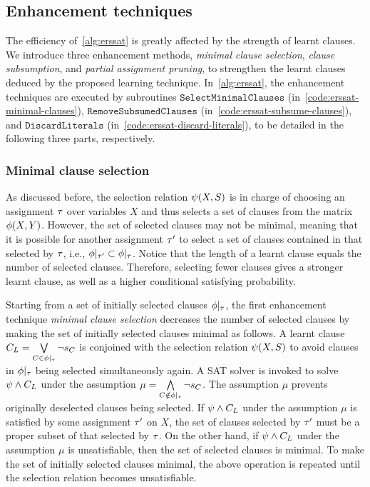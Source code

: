 \subsection{Enhancement techniques}
The efficiency of~\cref{alg:erssat} is greatly affected by the strength of learnt clauses.
We introduce three enhancement methods,
\textit{minimal clause selection},
\textit{clause subsumption}, and
\textit{partial assignment pruning},
to strengthen the learnt clauses deduced by the proposed learning technique.
In~\cref{alg:erssat},
the enhancement techniques are executed by subroutines
$\texttt{SelectMinimalClauses}$ (in~\cref{code:erssat-minimal-clauses}),
$\texttt{RemoveSubsumedClauses}$ (in~\cref{code:erssat-subsume-clauses}), and
$\texttt{DiscardLiterals}$ (in~\cref{code:erssat-discard-literals}),
to be detailed in the following three parts, respectively.

\subsubsection{Minimal clause selection}
As discussed before,
the selection relation $\psi(X,S)$ is in charge of choosing an assignment $\tau$ over variables $X$ and thus selects a set of clauses from the matrix $\phi(X,Y)$.
However, the set of selected clauses may not be minimal,
meaning that it is possible for another assignment $\tau'$ to select a set of clauses contained in that selected by $\tau$, i.e., $\phi|_{\tau'}\subset\phi|_{\tau}$.
Notice that the length of a learnt clause equals the number of selected clauses.
Therefore, selecting fewer clauses gives a stronger learnt clause,
as well as a higher conditional satisfying probability.

Starting from a set of initially selected clauses $\phi|_{\tau}$,
the first enhancement technique \textit{minimal clause selection} decreases the number of selected clauses by making the set of initially selected clauses minimal as follows.
A learnt clause $C_L=\bigvee\limits_{C\in\phi|_{\tau}}\lnot s_{C}$ is conjoined with the selection relation $\psi(X,S)$ to avoid clauses in $\phi|_{\tau}$ being selected simultaneously again.
A SAT solver is invoked to solve $\psi\land C_L$ under the assumption $\mu=\bigwedge\limits_{C\notin\phi|_{\tau}}\lnot s_{C}$.
The assumption $\mu$ prevents originally deselected clauses being selected.
If $\psi\land C_L$ under the assumption $\mu$ is satisfied by some assignment $\tau'$ on $X$,
the set of clauses selected by $\tau'$ must be a proper subset of that selected by $\tau$.
On the other hand, if $\psi\land C_L$ under the assumption $\mu$ is unsatisfiable,
then the set of selected clauses is minimal.
To make the set of initially selected clauses minimal,
the above operation is repeated until the selection relation becomes unsatisfiable.

